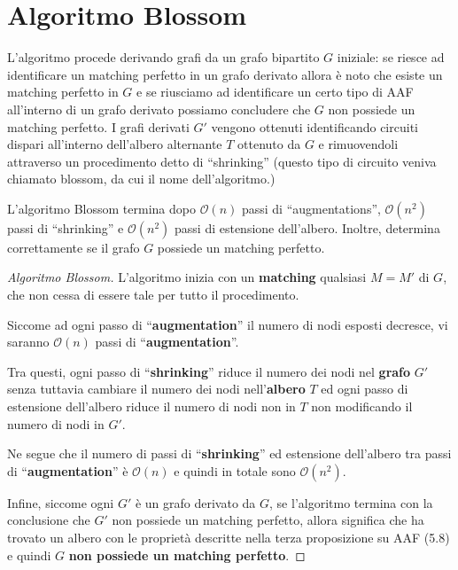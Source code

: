\documentclass[\main/main.tex]{subfiles}
\begin{document}
\clearpage
\section{Algoritmo Blossom}
L'algoritmo procede derivando grafi da un grafo bipartito \(G\) iniziale: se riesce ad identificare un matching perfetto in un grafo derivato allora è noto che esiste un matching perfetto in \(G\) e se riusciamo ad identificare un certo tipo di AAF all'interno di un grafo derivato possiamo concludere che \(G\) non possiede un matching perfetto. I grafi derivati \(G'\) vengono ottenuti identificando circuiti dispari all'interno dell'albero alternante \(T\) ottenuto da \(G\) e rimuovendoli attraverso un procedimento detto di ``shrinking'' (questo tipo di circuito veniva chiamato blossom, da cui il nome dell'algoritmo.)

\begin{theorem}
	L'algoritmo Blossom termina dopo \(\mathcal{O}(n)\) passi di ``augmentations'', \(\mathcal{O}(n^2)\) passi di ``shrinking'' e \(\mathcal{O}(n^2)\) passi di estensione dell'albero. Inoltre, determina correttamente se il grafo \(G\) possiede un matching perfetto.
\end{theorem}
\begin{proof}[Algoritmo Blossom]
	L'algoritmo inizia con un \textbf{matching} qualsiasi \(M=M'\) di \(G\), che non cessa di essere tale per tutto il procedimento.

	Siccome ad ogni passo di ``\textbf{augmentation}'' il numero di nodi esposti decresce, vi saranno \(\mathcal{O}(n)\) passi di ``\textbf{augmentation}''.

	Tra questi, ogni passo di ``\textbf{shrinking}'' riduce il numero dei nodi nel \textbf{grafo} \(G'\) senza tuttavia cambiare il numero dei nodi nell'\textbf{albero} \(T\) ed ogni passo di estensione dell'albero riduce il numero di nodi non in \(T\) non modificando il numero di nodi in \(G'\).

	Ne segue che il numero di passi di ``\textbf{shrinking}'' ed estensione dell'albero tra passi di ``\textbf{augmentation}'' è \(\mathcal{O}(n)\) e quindi in totale sono \(\mathcal{O}(n^2)\).

	Infine, siccome ogni \(G'\) è un grafo derivato da \(G\), se l'algoritmo termina con la conclusione che \(G'\) non possiede un matching perfetto, allora significa che ha trovato un albero con le proprietà descritte nella terza proposizione su AAF (5.8) e quindi \(G\) \textbf{non possiede un matching perfetto}.
\end{proof}
\clearpage
\end{document}
